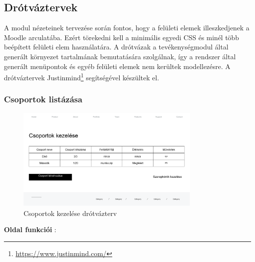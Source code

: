 \subsection{Drótváztervek}

A modul nézeteinek tervezése során fontos, hogy a felületi elemek illeszkedjenek a Moodle arculatába. Ezért törekedni kell a minimális egyedi CSS és minél több beépített felületi elem használatára. A drótvázak a tevékenységmodul által generált környezet tartalmának bemutatására szolgálnak, így a rendszer által generált menüpontok és egyéb felületi elemek nem kerültek modellezésre. A drótváztervek Justinmind\footnote{\url{https://www.justinmind.com/}} segítségével készültek el.

\subsubsection{Csoportok listázása}

\begin{figure}[H]
	\centering
	\includegraphics[width=0.8\textwidth]{images/csoportok_kezelese_wire.png}
	\caption{Csoportok kezelése drótvázterv}
\end{figure}
\textbf{Oldal funkciói} :


